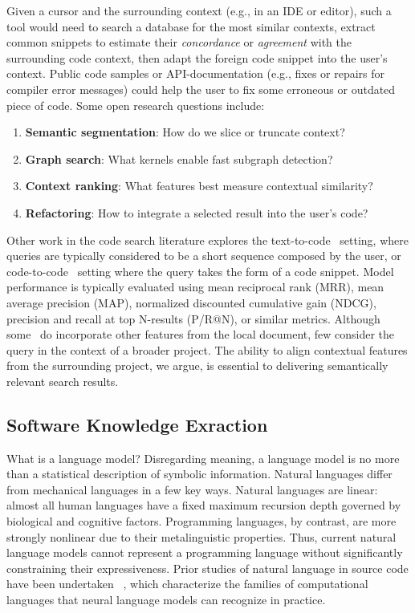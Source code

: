 \documentclass[12pt]{article}
\begin{document}
Given a cursor and the surrounding context (e.g., in an IDE or editor), such a tool would need to search a database for the most similar contexts, extract common snippets to estimate their \textit{concordance} or \textit{agreement} with the surrounding code context, then adapt the foreign code snippet into the user's context. Public code samples or API-documentation (e.g., fixes or repairs for compiler error messages) could help the user to fix some erroneous or outdated piece of code. Some open research questions include:

  \begin{enumerate}
    \item \textbf{Semantic segmentation}: How do we slice or truncate context?
    \item \textbf{Graph search}: What kernels enable fast subgraph detection?
    \item \textbf{Context ranking}: What features best measure contextual similarity?
    \item \textbf{Refactoring}: How to integrate a selected result into the user's code?
  \end{enumerate}


Other work in the code search literature explores the text-to-code~\cite{husain2019codesearchnet} setting, where queries are typically considered to be a short sequence composed by the user, or code-to-code~\cite{kim2018facoy} setting where the query takes the form of a code snippet. Model performance is typically evaluated using mean reciprocal rank (MRR), mean average precision (MAP), normalized discounted cumulative gain (NDCG), precision and recall at top N-results (P/R@N), or similar metrics. Although some~\cite{asyrofi2020ausearch} do incorporate other features from the local document, few consider the query in the context of a broader project. The ability to align contextual features from the surrounding project, we argue, is essential to delivering semantically relevant search results.

  \subsection{Software Knowledge Exraction}\label{subsec:knowledge-extraction}

What is a language model? Disregarding meaning, a language model is no more than a statistical description of symbolic information. Natural languages differ from mechanical languages in a few key ways. Natural languages are linear: almost all human languages have a fixed maximum recursion depth governed by biological and cognitive factors. Programming languages, by contrast, are more strongly nonlinear due to their metalinguistic properties. Thus, current natural language models cannot represent a programming language without significantly constraining their expressiveness. Prior studies of natural language in source code have been undertaken ~\cite{weiss2018practical, chirkova2020empirical, chen2021evaluating}, which characterize the families of computational languages that neural language models can recognize in practice.
\end{document}
